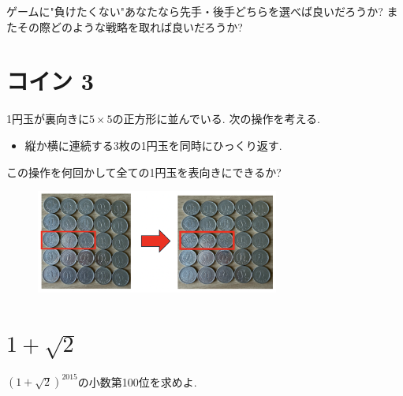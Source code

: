 \documentclass[dvipdfmx,a4paper,12pt]{article} %
\theoremstyle{definition}
\theoremstyle{remark}
\numberwithin{equation}{section}
\begin{document}
ゲームに"負けたくない"あなたなら先手・後手どちらを選べば良いだろうか?
またその際どのような戦略を取れば良いだろうか?

\section{コイン 3}
1円玉が裏向きに$5 \times 5$の正方形に並んでいる.
次の操作を考える. 
\begin{itemize}
\item 縦か横に連続する3枚の1円玉を同時にひっくり返す.
\end{itemize}

 この操作を何回かして全ての1円玉を表向きにできるか?
 
 \begin{figure}[htbp]
\begin{center}
\includegraphics[width=80mm]{coin3.png}
\end{center}
\end{figure}

\section{$1 + \sqrt{2}$}
$(1 + \sqrt{2})^{2015}$の小数第100位を求めよ.





 
\end{document}
